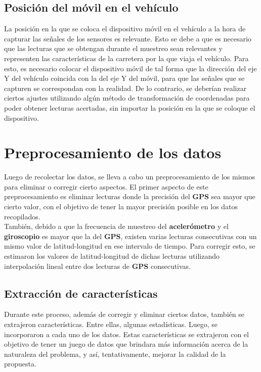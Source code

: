 	\subsection{Posición del móvil en el vehículo}
		La posición en la que se coloca el dispositivo móvil en el vehículo a la hora de capturar las señales de los sensores es
		relevante. Esto se debe a que es necesario que las lecturas que se obtengan durante el muestreo sean relevantes y representen
		las características de la carretera por la que viaja el vehículo. Para esto, es necesario colocar el dispositivo móvil de tal 
		forma que la dirección del eje Y del vehículo coincida con la del eje Y del móvil, para que las señales que se capturen
		se correspondan con la realidad. De lo contrario, se deberían realizar ciertos ajustes utilizando algún método de
		transformación de coordenadas para poder obtener lecturas acertadas, sin importar la posición en la que se coloque
		el dispositivo.

\section{Preprocesamiento de los datos}
	Luego de recolectar los datos, se lleva a cabo un preprocesamiento de los mismos para eliminar o corregir cierto aspectos.
	El primer aspecto de este preprocesamiento es eliminar lecturas donde la precisión del \textbf{GPS} sea mayor que cierto valor,
	con el objetivo de tener la mayor precisión posible en los datos recopilados.\\
	\indent También, debido a que la frecuencia de muestreo del \textbf{acelerómetro} y el \textbf{giroscopio} es mayor que la del
	\textbf{GPS}, existen varias lecturas consecutivas con un mismo valor de latitud-longitud en ese intervalo de tiempo. Para
	corregir esto, se estimaron los valores de latitud-longitud de dichas lecturas utilizando interpolación lineal entre dos lecturas
	de \textbf{GPS} consecutivas.

	\subsection{Extracción de características}
		Durante este proceso, además de corregir y eliminar ciertos datos, también se extrajeron características. Entre ellas,
		algunas estadísticas.  Luego, se incorporaron a cada uno de los datos. Estas características se extrajeron con el objetivo
		de tener un juego de datos que brindara más información acerca de la naturaleza del problema, y así, tentativamente,
		mejorar la calidad de la propuesta.\\

